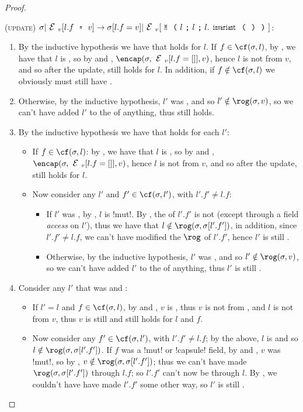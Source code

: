 \begin{proof}
\begin{ienumerate}
\item (\textsc{update}) $\s|\EV[l.f\equals{}v]\rightarrow \s[l.f=v]|\EV[\M{l}{l}{l.\invariant}]$:
\begin{enumerate}
	\item By the inductive hypothesis we have that \CNC holds for $l$. If $f \in \cf(\s, l)$, by , we have that $l$ is \muty, so by  and , $\encap(\s, \EV[l.f = \square], v)$, hence $l$ is not \reach from $v$, and so after the update, \CNC still holds for $l$. In addition, if $f \notin \cf(\s, l)$ we obviously must still have \CNC. 	\item Otherwise, by the inductive hypothesis, $l'$ was \HNO, and so $l' \notin \rog(\s, v)$, so we can't have added $l'$ to the \rog of anything, thus \CNC still holds.
	\item By the inductive hypothesis we have that \CNC holds for each $l'$:
	\begin{itemize}
		\item If $f \in \cf(\s, l)$: by , we have that $l$ is \muty, so by  and , $\encap(\s, \EV[l.f = \square], v)$, hence $l$ is not \reach from $v$, and so after the update, \CNC still holds for $l$.
		\item Now consider any $l'$ and $f' \in \cf(\s, l')$, with $l'.f' \neq l.f$:
		\begin{itemize}
			\item If $l'$ was \WE, by , $l$ is \Q!mut!. By \WE, the \rog of $l'.f'$ is not \muty (except through a field \emph{access} on $l'$), thus we have that $l \notin \rog(\s, \s[l'.f'])$, in addition, since $l'.f' \neq l.f$, we can't have modified the $\rog$ of $l'.f'$, hence $l'$ is still \CNC.
			\item Otherwise, by the inductive hypothesis, $l'$ was \HNO, and so $l' \notin \rog(\s, v)$, so we can't have added $l'$ to the \rog of anything, thus $l'$ is still \CNC.
		\end{itemize}
	\end{itemize}
	\item Consider any $l'$ that was \WE and \NCM:
	\begin{itemize}
		\item If $l' = l$ and $f \in \cf(\s, l)$, by  and , $v$ is \encap, thus $v$ is not \muty from \EV, and $l$ is not \reach from $v$, thus $v$ is still \encap and \WE still holds for $l$ and $f$.
		\item Now consider any $f' \in \cf(\s, l')$, with $l'.f' \neq l.f$; by the above, $l$ is \CNC and so $l \notin \rog(\s, \s[l'.f'])$. If $f$ was a \Q!mut! or \Q!capsule! field, by  and , $v$ was \Q!mut!, so by \WE, $v \notin \rog(\s, \s[l'.f'])$; thus we can't have made $\rog(\s, \s[l'.f'])$ \muty through $l.f$; so $l'.f'$ can't now be \muty through $l$. By , we couldn't have have made $l'.f'$ \muty some other way, so $l'$ is still \WE.

\end{itemize}
\end{enumerate}
\end{ienumerate}
\end{proof}
